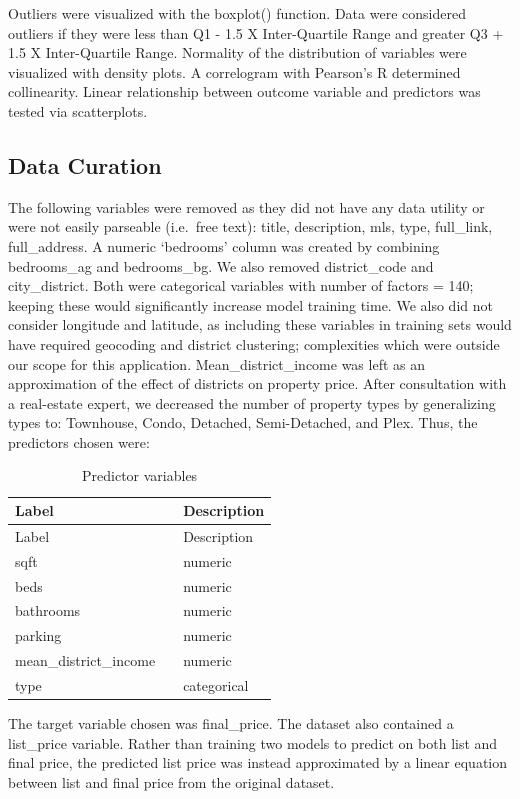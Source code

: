 \documentclass[11pt,]{article}
\begin{document}
Outliers were visualized with the boxplot() function. Data were
considered outliers if they were less than Q1 - 1.5 X Inter-Quartile
Range and greater Q3 + 1.5 X Inter-Quartile Range. Normality of the
distribution of variables were visualized with density plots. A
correlogram with Pearson's R determined collinearity. Linear
relationship between outcome variable and predictors was tested via
scatterplots.

\hypertarget{data-curation-1}{%
\subsection{Data Curation}\label{data-curation-1}}

The following variables were removed as they did not have any data
utility or were not easily parseable (i.e.~free text): title,
description, mls, type, full\_link, full\_address. A numeric `bedrooms'
column was created by combining bedrooms\_ag and bedrooms\_bg. We also
removed district\_code and city\_district. Both were categorical
variables with number of factors = 140; keeping these would
significantly increase model training time. We also did not consider
longitude and latitude, as including these variables in training sets
would have required geocoding and district clustering; complexities
which were outside our scope for this application.
Mean\_district\_income was left as an approximation of the effect of
districts on property price. After consultation with a real-estate
expert, we decreased the number of property types by generalizing types
to: Townhouse, Condo, Detached, Semi-Detached, and Plex. Thus, the
predictors chosen were:

\begin{longtable}[]{@{}lll@{}}
\caption{Predictor variables}\tabularnewline
\toprule
Label & & Description\tabularnewline
\midrule
\endfirsthead
\toprule
Label & & Description\tabularnewline
\midrule
\endhead
sqft & & numeric\tabularnewline
beds & & numeric\tabularnewline
bathrooms & & numeric\tabularnewline
parking & & numeric\tabularnewline
mean\_district\_income & & numeric\tabularnewline
type & & categorical\tabularnewline
\bottomrule
\end{longtable}

The target variable chosen was final\_price. The dataset also contained
a list\_price variable. Rather than training two models to predict on
both list and final price, the predicted list price was instead
approximated by a linear equation between list and final price from the
original dataset.
\end{document}
